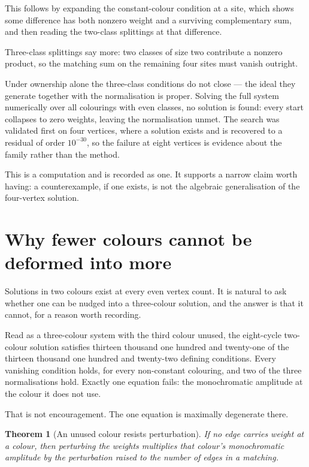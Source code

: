 \documentclass[11pt]{article}
\newtheorem{theorem}{Theorem}[section]
\theoremstyle{definition}
\theoremstyle{remark}
\begin{document}
This follows by expanding the constant-colour condition at a site, which shows some
difference has both nonzero weight and a surviving complementary sum, and then reading
the two-class splittings at that difference.

Three-class splittings say more: two classes of size two contribute a nonzero product,
so the matching sum on the remaining four sites must vanish outright.

Under ownership alone the three-class conditions do not close --- the ideal they
generate together with the normalisation is proper. Solving the full system numerically
over all colourings with even classes, no solution is found: every start collapses to
zero weights, leaving the normalisation unmet. The search was validated first on four
vertices, where a solution exists and is recovered to a residual of order $10^{-30}$, so
the failure at eight vertices is evidence about the family rather than the method.

This is a computation and is recorded as one. It supports a narrow claim worth having: a
counterexample, if one exists, is not the algebraic generalisation of the four-vertex
solution.

\section{Why fewer colours cannot be deformed into more}\label{sec:unused}

Solutions in two colours exist at every even vertex count. It is natural to ask whether
one can be nudged into a three-colour solution, and the answer is that it cannot, for a
reason worth recording.

Read as a three-colour system with the third colour unused, the eight-cycle two-colour
solution satisfies thirteen thousand one hundred and twenty-one of the thirteen thousand
one hundred and twenty-two defining conditions. Every vanishing condition holds, for
every non-constant colouring, and two of the three normalisations hold. Exactly one
equation fails: the monochromatic amplitude at the colour it does not use.

That is not encouragement. The one equation is maximally degenerate there.

\begin{theorem}[An unused colour resists perturbation]
If no edge carries weight at a colour, then perturbing the weights multiplies that
colour's monochromatic amplitude by the perturbation raised to the number of edges in a
matching.
\end{theorem}
\end{document}
